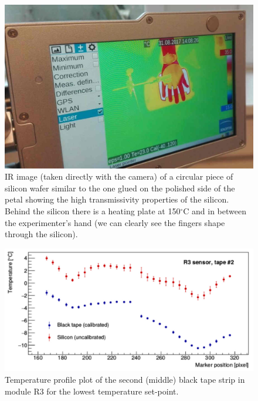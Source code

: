 		\begin{figure}[ht!]
			\centering
			\captionsetup{justification=centering,margin=2cm}
			\includegraphics[scale=0.35]{Figures/Chapter04/HandTransmission.jpg}
			\caption{IR image (taken directly with the camera) of a circular piece of silicon wafer similar to the one glued on the polished side of the petal showing the high transmissivity properties of the silicon. Behind the silicon there is a heating plate at 150\space$^{\circ}$C and in between the experimenter’s hand (we can clearly see the fingers shape through the silicon).}\label{fig4.4}
		\end{figure}
		
		\begin{figure}[ht!]
			\centering
			\captionsetup{justification=centering,margin=2cm}
			\includegraphics[scale=0.35]{Figures/Chapter04/R3Profile_Si_and_BT.jpg}
			\caption{Temperature profile plot of the second (middle) black tape strip in module R3 for the lowest temperature set-point.}\label{fig4.5}
		\end{figure}
		
